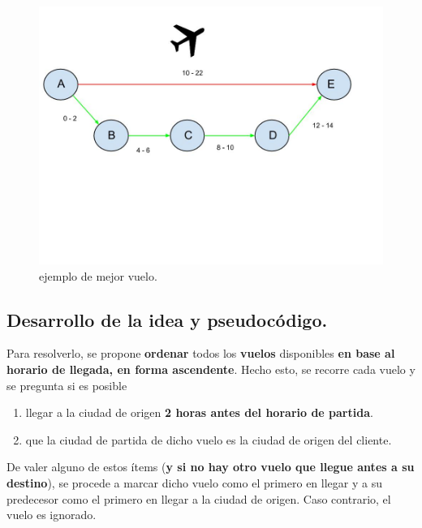 \begin{figure}[htb]
  \begin{center}
      \includegraphics[scale=0.25]{imagenes/plane.jpg}
  \end{center}
  \caption{ejemplo de mejor vuelo.}
\end{figure}



\newpage
\subsection{Desarrollo de la idea y pseudocódigo.}

\vspace*{0.3cm}

Para resolverlo, se propone \textbf{ordenar} todos los \textbf{vuelos} disponibles
\textbf{en base al horario de llegada, en forma ascendente}. Hecho esto, se recorre
cada vuelo y se pregunta si es posible

\begin{enumerate}
  \item llegar a la ciudad de origen \textbf{2 horas antes del horario de partida}.

  \item que la ciudad de partida de dicho vuelo es la ciudad de origen del cliente.
\end{enumerate}

De valer alguno de estos ítems (\textbf{y si no hay otro vuelo que llegue antes
a su destino}), se procede a marcar dicho vuelo como el primero en llegar y a
su predecesor como el primero en llegar a la ciudad de origen. Caso contrario,
el vuelo es ignorado.

